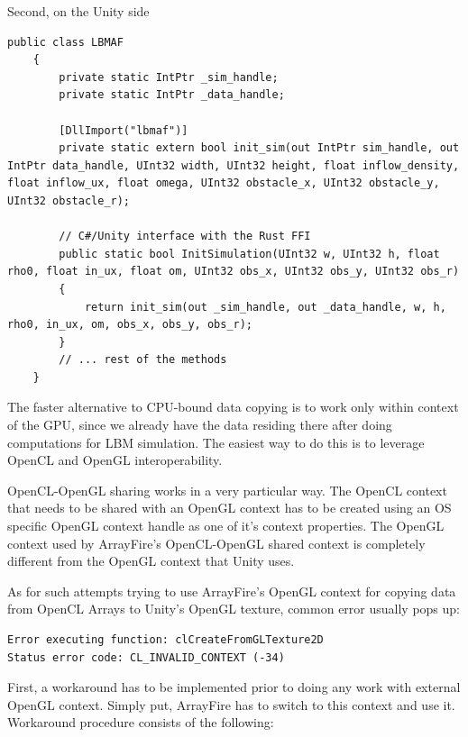 Second, on the Unity side

\begin{lstlisting}[language=Csharp, caption=The CPU-bound copying of the simulation results., label=unity-marshal-copy]
	public class LBMAF
	{
		private static IntPtr _sim_handle;
		private static IntPtr _data_handle;
		
		[DllImport("lbmaf")]
		private static extern bool init_sim(out IntPtr sim_handle, out IntPtr data_handle, UInt32 width, UInt32 height, float inflow_density, float inflow_ux, float omega, UInt32 obstacle_x, UInt32 obstacle_y, UInt32 obstacle_r);
		
		// C#/Unity interface with the Rust FFI
		public static bool InitSimulation(UInt32 w, UInt32 h, float rho0, float in_ux, float om, UInt32 obs_x, UInt32 obs_y, UInt32 obs_r)
		{
			return init_sim(out _sim_handle, out _data_handle, w, h, rho0, in_ux, om, obs_x, obs_y, obs_r);
		}
		// ... rest of the methods
	}
\end{lstlisting}

The faster alternative to CPU-bound data copying is to work only within context of the GPU, since we already have the data residing there after doing computations for LBM simulation. The easiest way to do this is to leverage OpenCL and OpenGL interoperability. \citep{malcolmArrayFireGPUAcceleration2012}
 
OpenCL-OpenGL sharing works in a very particular way. The OpenCL context that needs to be shared with an OpenGL context has to be created using an OS specific OpenGL context handle as one of it's context properties. The OpenGL context used by ArrayFire's OpenCL-OpenGL shared context is completely different from the OpenGL context that Unity uses.

As for such attempts trying to use ArrayFire's OpenGL context for copying data from OpenCL Arrays to Unity's OpenGL texture, common error usually pops up:

\begin{lstlisting}
Error executing function: clCreateFromGLTexture2D  
Status error code: CL_INVALID_CONTEXT (-34)  
\end{lstlisting}

First, a workaround has to be implemented prior to doing any work with external OpenGL context. Simply put, ArrayFire has to switch to this context and use it. Workaround procedure consists of the following:

